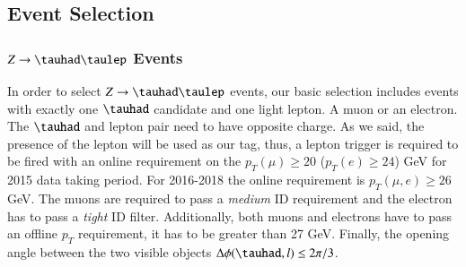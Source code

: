 \subsection{Event Selection}\label{sec3.3}
\subsubsection{$Z\to\tauhad\taulep$ Events}\label{sec3.3.1}
In order to select $Z\to\tauhad\taulep$ events, our basic selection includes events with exactly one $\tauhad$ candidate and one light lepton. A muon or an electron. The $\tauhad$ and lepton pair need to have opposite charge. As we said, the presence of the lepton will be used as our tag, thus, a lepton trigger is required to be fired with an online requirement on the $p_{T}(\mu)\geq 20$ ($p_{T}(e)\geq 24$) GeV for 2015 data taking period. For 2016-2018 the online requirement is $p_{T}(\mu,e)\geq 26$ GeV. The muons are required to pass a \textit{medium} ID requirement and the electron has to pass a \textit{tight} ID filter. Additionally, both muons and electrons have to pass an offline $p_T$ requirement, it has to be greater than 27 GeV. Finally, the opening angle between the two visible objects $\Delta\phi(\tauhad,l)\leq 2\pi/3$.

